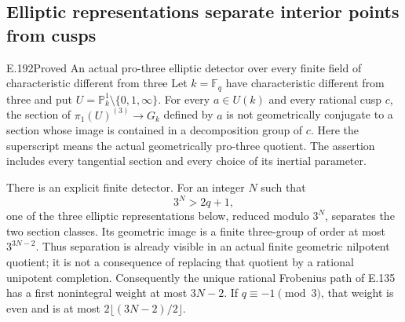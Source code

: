\subsection{Elliptic representations separate interior points from cusps}

\begin{result}{E.192}{Proved}
{An actual pro-three elliptic detector over every finite field of characteristic different from three}
Let \(k=\mathbb F_q\) have characteristic different from three and put
\(U=\mathbb P^1_k\setminus\{0,1,\infty\}\).
For every \(a\in U(k)\) and every rational cusp \(c\), the section of
\(\pi_1(U)^{(3)}\to G_k\) defined by \(a\) is not geometrically conjugate
to a section whose image is contained in a decomposition group of \(c\).
Here the superscript means the actual geometrically pro-three quotient.
The assertion includes every tangential section and every choice of its
inertial parameter.

There is an explicit finite detector.  For an integer \(N\) such that
\[
                         3^N>2q+1,
\tag{E.192.1}
\]
one of the three elliptic representations below, reduced modulo \(3^N\),
separates the two section classes.  Its geometric image is a finite
three-group of order at most \(3^{3N-2}\).
Thus separation is already visible in an actual finite geometric
nilpotent quotient; it is not a consequence of replacing that quotient
by a rational unipotent completion.
Consequently the unique rational Frobenius path of E.135 has a first
nonintegral weight at most \(3N-2\).  If \(q\equiv-1\pmod3\), that
weight is even and is at most \(2\lfloor(3N-2)/2\rfloor\).
\end{result}

